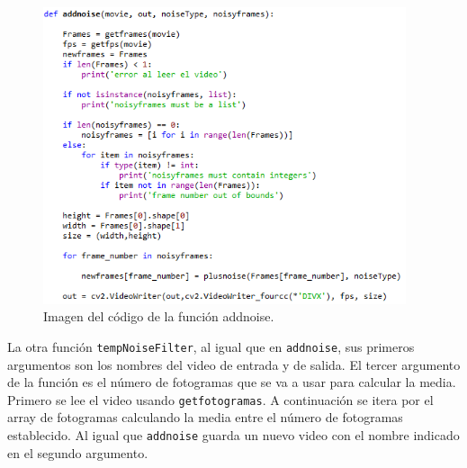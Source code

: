 \begin{figure}[h]
\centering
\includegraphics[width=0.95\textwidth]{imagenes/addnoise}
\caption{Imagen del código de la función addnoise.}
\label{addnoise} 
\end{figure}

La otra función \texttt{tempNoiseFilter}, al igual que en \texttt{addnoise}, sus primeros argumentos son los nombres del video de entrada y de salida. El tercer argumento de la función es el número de fotogramas que se va a usar para calcular la media. Primero se lee el video usando \texttt{getfotogramas}. A continuación se itera por el array de fotogramas calculando la media entre el número de fotogramas establecido. Al igual que \texttt{addnoise} guarda un nuevo video con el nombre indicado en el segundo argumento.\\